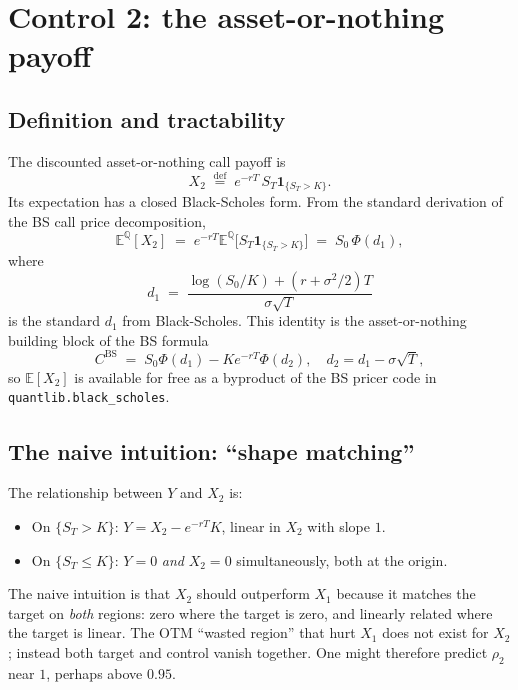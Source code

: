 \documentclass[11pt,a4paper]{article}
\theoremstyle{plain}
\theoremstyle{definition}
\theoremstyle{remark}
\newcommand{\E}{\mathbb{E}}
\newcommand{\Q}{\mathbb{Q}}
\newcommand{\eqdef}{\overset{\mathrm{def}}{=}}
\newcommand{\indic}{\mathbf{1}}
\begin{document}
\section{Control 2: the asset-or-nothing payoff}
\label{sec:cv-aon}

\subsection{Definition and tractability}

The discounted asset-or-nothing call payoff is
\begin{equation}
X_2 \;\eqdef\; e^{-rT}\, S_T \indic_{\{S_T > K\}}.
\end{equation}
Its expectation has a closed Black-Scholes form. From the standard
derivation of the BS call price decomposition,
\begin{equation}
\E^\Q[X_2] \;=\; e^{-rT} \E^\Q\bigl[S_T \indic_{\{S_T > K\}}\bigr]
\;=\; S_0 \, \Phi(d_1),
\end{equation}
where
\begin{equation}
d_1 \;=\; \frac{\log(S_0 / K) + (r + \sigma^2 / 2) T}{\sigma \sqrt T}
\end{equation}
is the standard $d_1$ from Black-Scholes. This identity is the
asset-or-nothing building block of the BS formula
\begin{equation}
C^{\mathrm{BS}} \;=\; S_0 \Phi(d_1) - K e^{-rT} \Phi(d_2),
\quad d_2 = d_1 - \sigma\sqrt T,
\end{equation}
so $\E[X_2]$ is available for free as a byproduct of the BS pricer
code in \texttt{quantlib.black\_scholes}.

\subsection{The naive intuition: ``shape matching''}

The relationship between $Y$ and $X_2$ is:
\begin{itemize}
\item On $\{S_T > K\}$: $Y = X_2 - e^{-rT} K$, linear in $X_2$ with
slope $1$.
\item On $\{S_T \leq K\}$: $Y = 0$ \emph{and} $X_2 = 0$
simultaneously, both at the origin.
\end{itemize}
The naive intuition is that $X_2$ should outperform $X_1$ because it
matches the target on \emph{both} regions: zero where the target is
zero, and linearly related where the target is linear. The OTM
``wasted region'' that hurt $X_1$ does not exist for $X_2$; instead
both target and control vanish together. One might therefore predict
$\rho_2$ near $1$, perhaps above $0.95$.
\end{document}

